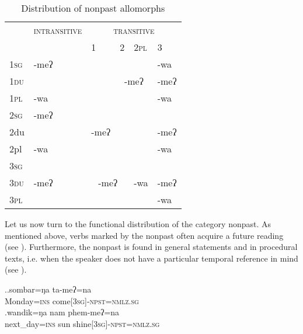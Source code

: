 \begin{table}
\begin{centering} 
\begin{tabular}{|l||l|p{1.4cm}|p{1.4cm}|l|p{1.4cm}|}
\hline
		& {\scshape intransitive}&	\multicolumn{4}{c|}{ {\scshape transitive}}  \\
		\cline{3-6}
		&&	 {\scshape 1}&  {\scshape 2}&  {\scshape 2pl} &  {\scshape 3} \\
\hline
\hline
 {\scshape 1sg} 		&-meʔ& \cellcolor[gray]{.8}&\multicolumn{2}{c|}{}&-wa\\
 \cline{1-1} \cline{6-6} 		
 {\scshape 1du}		& & \cellcolor[gray]{.8}&\multicolumn{2}{c|}{-meʔ}&-meʔ\\
 \cline{1-2} \cline{6-6} 			
 {\scshape 1pl}		&-wa & \cellcolor[gray]{.8}&\multicolumn{2}{c|}{}&-wa\\
 \cline{1-5}				
 {\scshape 2sg} 		&-meʔ &&\multicolumn{2}{c|}{\cellcolor[gray]{.8}} &\\
 \cline{1-1} \cline{6-6}			
 {\sc2du}		& &-meʔ& \multicolumn{2}{c|}{\cellcolor[gray]{.8}}  &-meʔ\\
 \cline{1-2} \cline{6-6}			
 {\sc2pl}		&-wa &&\multicolumn{2}{c|}{\cellcolor[gray]{.8}}  &-wa\\
 \cline{1-5}				
 {\scshape 3sg} 		&&\multicolumn{2}{c|}{} &  &\\
  \cline{1-1}  \cline{6-6}					
 {\scshape 3du}&-meʔ&\multicolumn{2}{c|}{-meʔ}  &  -wa&-meʔ\\
 \cline{1-1} \cline{6-6}
 {\scshape 3pl}& &\multicolumn{2}{c|}{}&  &-wa\\
\hline
\end{tabular}
\caption{Distribution of nonpast allomorphs}\label{par-npst-allo}
\end{centering}
\end{table}

Let us now turn to the functional distribution of the category nonpast. As mentioned above, verbs marked by the nonpast  often acquire a future reading (see \Next).  Furthermore, the nonpast is  found in general statements and in procedural texts, i.e. when the speaker does not have a particular temporal reference in mind (see \NNext). 

\ex.\ag.sombar=ŋa ta-meʔ=na\\
Monday{\scshape =ins} come{\scshape [3sg]-npst=nmlz.sg}\\
\bg.wandik=ŋa nam phem-meʔ=na\\
next\_day{\scshape =ins} sun shine{\scshape [3sg]-npst=nmlz.sg}\\

